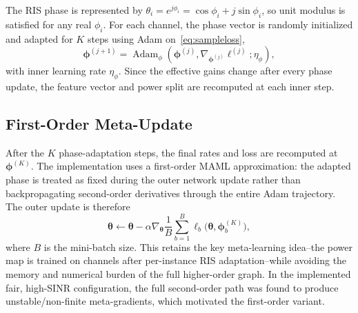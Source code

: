 The RIS phase is represented by
$\theta_i=e^{j\phi_i}=\cos\phi_i+j\sin\phi_i$, so unit modulus is satisfied for
any real $\phi_i$. For each channel, the phase vector is randomly initialized
and adapted for $K$ steps using Adam on~\eqref{eq:sampleloss},
\begin{equation}
\bm\phi^{(j+1)}=\operatorname{Adam}_{\phi}
\left(\bm\phi^{(j)},\nabla_{\bm\phi^{(j)}}\ell^{(j)};\eta_{\phi}\right),
\label{eq:inner}
\end{equation}
with inner learning rate $\eta_{\phi}$. Since the effective gains change after
every phase update, the feature vector and power split are recomputed at each
inner step.

\subsection{First-Order Meta-Update}
After the $K$ phase-adaptation steps, the final rates and loss are recomputed at
$\bm\phi^{(K)}$. The implementation uses a first-order MAML approximation: the
adapted phase is treated as fixed during the outer network update rather than
backpropagating second-order derivatives through the entire Adam trajectory.
The outer update is therefore
\begin{equation}
\bm\theta\leftarrow\bm\theta-\alpha
\nabla_{\bm\theta}\frac{1}{B}\sum_{b=1}^{B}
\ell_b\big(\bm\theta,\bm\phi_b^{(K)}\big), \label{eq:outer}
\end{equation}
where $B$ is the mini-batch size. This retains the key meta-learning idea--the
power map is trained on channels after per-instance RIS adaptation--while
avoiding the memory and numerical burden of the full higher-order graph. In the
implemented fair, high-SINR configuration, the full second-order path was found
to produce unstable/non-finite meta-gradients, which motivated the first-order
variant.


